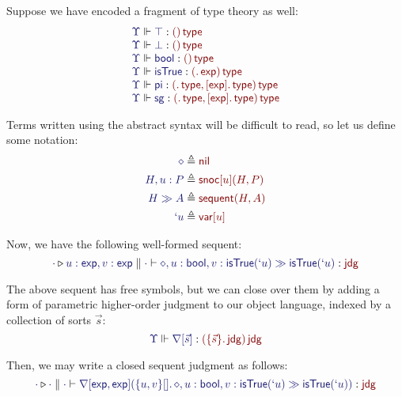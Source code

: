 \documentclass[11pt]{article}
\theoremstyle{definition}
\theoremstyle{remark}
\numberwithin{equation}{section}
\def\IModeColorName{MidnightBlue}
\def\OModeColorName{Maroon}
\newcommand\IMode[1]{{\color{\IModeColorName}{#1}}}
\newcommand\OMode[1]{{\color{\OModeColorName}{#1}}}
\newcommand\MkValence[3]{%
  \ifthenelse{\equal{#1}{}}{}{%
    \{#1\}%
  }%
  \ifthenelse{\equal{#2}{}}{}{%
    [#2]%
  }.\, #3%
}
\newcommand\MkBTm[3]{\{#1\}[#2].\, #3}
\newcommand\MkArity[2]{(#1)\, #2}
\newcommand\IsOperator[3]{\IMode{#1}\Vdash\IMode{#2}: \OMode{#3}}
\newcommand\IsAbt[5]{%
  \IMode{#1}\triangleright%
  \IMode{#2}\parallel%
  \IMode{#3}\vdash%
  \IMode{#4}:\OMode{#5}%
}
\newcommand\App[2]{#1(#2)}
\newcommand\SortExp{\mathsf{exp}}
\begin{document}
\newcommand\OpPi{\mathsf{pi}}
\newcommand\OpSg{\mathsf{sg}}
\newcommand\OpBool{\mathsf{bool}}
\newcommand\OpSo{\mathsf{isTrue}}

Suppose we have encoded a fragment of type theory as well:
\[
  \begin{array}{l}
    \IsOperator{\Upsilon}{\top}{
      \MkArity{}{\SortType}
    }\\
    \IsOperator{\Upsilon}{\bot}{
      \MkArity{}{\SortType}
    }\\
    \IsOperator{\Upsilon}{\OpBool}{
      \MkArity{}{\SortType}
    }\\
    \IsOperator{\Upsilon}{\OpSo}{
      \MkArity{
        \MkValence{}{}{\SortExp}
      }{\SortType}
    }\\
    \IsOperator{\Upsilon}{\OpPi}{
      \MkArity{
        \MkValence{}{}{\SortType},
        \MkValence{}{\SortExp}{\SortType}
      }{\SortType}
    }\\
    \IsOperator{\Upsilon}{\OpSg}{
      \MkArity{
        \MkValence{}{}{\SortType},
        \MkValence{}{\SortExp}{\SortType}
      }{\SortType}
    }\\
  \end{array}
\]

Terms written using the abstract syntax will be difficult to read, so let us
define some notation:
\begin{align*}
  \IMode{\diamond} &\triangleq \OMode{\OpNil}\\
  \IMode{H, u:P} &\triangleq \OMode{
    \App{\OpSnoc{u}}{H, P}
  }\\
  \IMode{H\gg A} &\triangleq \OMode{
    \App{\OpSequent}{
      H, A
    }
  }\\
  \IMode{`u} &\triangleq \OMode{\OpVar{u}}
\end{align*}

Now, we have the following well-formed sequent:
\[
  \IsAbt{\cdot}{
    u:\SortExp,
    v:\SortExp
  }{\cdot}{
    \diamond,u:\OpBool,v:\App{\OpSo}{`u}%
    \gg%
    \App{\OpSo}{`u}
  }{\SortJdg}
\]

\newcommand\OpNabla[1]{\nabla[#1]}

The above sequent has free symbols, but we can close over them by adding a form
of parametric higher-order judgment to our object language, indexed by a
collection of sorts $\vec{s}$:
\[
  \IsOperator{\Upsilon}{\OpNabla{\vec{s}}}{
    \MkArity{
      \MkValence{\vec{s}}{}{\SortJdg}
    }{\SortJdg}
  }
\]

Then, we may write a closed sequent judgment as follows:
\[
  \IsAbt{\cdot}{\cdot}{\cdot}{
    \App{\OpNabla{\SortExp,\SortExp}}{
      \MkBTm{u,v}{}{
        \diamond,u:\OpBool,v:\App{\OpSo}{`u}%
        \gg%
        \App{\OpSo}{`u}
      }
    }
  }{\SortJdg}
\]
\end{document}
